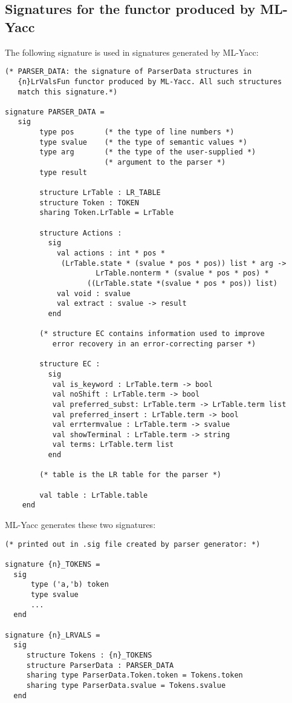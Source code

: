 \subsection{Signatures for the functor produced by ML-Yacc}

The following signature is used in signatures generated by
ML-Yacc:
\begin{tt}
\begin{verbatim}
(* PARSER_DATA: the signature of ParserData structures in
   {n}LrValsFun functor produced by ML-Yacc. All such structures
   match this signature.*)

signature PARSER_DATA =
   sig
        type pos       (* the type of line numbers *)
        type svalue    (* the type of semantic values *)
        type arg       (* the type of the user-supplied *)
                       (* argument to the parser *)
        type result

        structure LrTable : LR_TABLE
        structure Token : TOKEN
        sharing Token.LrTable = LrTable

        structure Actions : 
          sig
            val actions : int * pos *
             (LrTable.state * (svalue * pos * pos)) list * arg ->
                     LrTable.nonterm * (svalue * pos * pos) *
                   ((LrTable.state *(svalue * pos * pos)) list)
            val void : svalue
            val extract : svalue -> result
          end

        (* structure EC contains information used to improve
           error recovery in an error-correcting parser *)

        structure EC :
          sig
           val is_keyword : LrTable.term -> bool
           val noShift : LrTable.term -> bool
           val preferred_subst: LrTable.term -> LrTable.term list
           val preferred_insert : LrTable.term -> bool
           val errtermvalue : LrTable.term -> svalue
           val showTerminal : LrTable.term -> string
           val terms: LrTable.term list
          end

        (* table is the LR table for the parser *)

        val table : LrTable.table
    end
\end{verbatim}
\end{tt}

ML-Yacc generates these two signatures:
\begin{tt}
\begin{verbatim}
(* printed out in .sig file created by parser generator: *)

signature {n}_TOKENS = 
  sig
      type ('a,'b) token
      type svalue
      ...
  end

signature {n}_LRVALS =
  sig
     structure Tokens : {n}_TOKENS
     structure ParserData : PARSER_DATA
     sharing type ParserData.Token.token = Tokens.token
     sharing type ParserData.svalue = Tokens.svalue
  end
\end{verbatim}
\end{tt}
